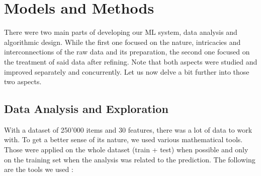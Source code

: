 \documentclass[10pt,conference,compsocconf]{IEEEtran}
\begin{document}
\section{Models and Methods}
\label{sec:mod_meth}

There were two main parts of developing our ML system, data analysis and algorithmic design. While the first one focused on the nature, intricacies and interconnections of the raw data and its preparation, the second one focused on the treatment of said data after refining. Note that both aspects were studied and improved separately and concurrently.  Let us now delve a bit further into those two aspects.

\subsection{Data Analysis and Exploration}
With a dataset of 250'000 items and 30 features, there was a lot of data to work with. To get a better sense of its nature, we used various mathematical tools. Those were applied on the whole dataset (train + test) when possible and only on the training set when the analysis was related to the prediction. The following are the tools we used :
\end{document}
